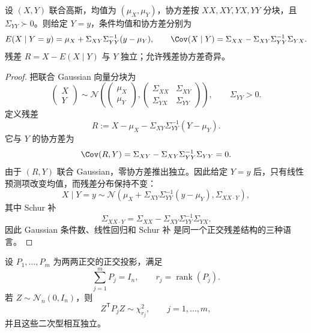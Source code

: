 \begin{proposition}
设 $(X,Y)$ 联合高斯，均值为 $(\mu_X,\mu_Y)$，协方差按 $XX,XY,YX,YY$ 分块，且 $\Sigma_{YY}\succ0$。则给定 $Y=y$，条件均值和协方差分别为
\[
E(X\mid Y=y)=\mu_X+\Sigma_{XY}\Sigma_{YY}^{-1}(y-\mu_Y),
\qquad
\Cov(X\mid Y)=\Sigma_{XX}-\Sigma_{XY}\Sigma_{YY}^{-1}\Sigma_{YX}.
\]
残差 $R=X-E(X\mid Y)$ 与 $Y$ 独立；允许残差协方差奇异。
\end{proposition}
\begin{proof}
把联合 Gaussian 向量分块为
\[
\begin{pmatrix}X\\Y\end{pmatrix}
\sim
\mathcal N\!\left(
\begin{pmatrix}\mu_X\\\mu_Y\end{pmatrix},
\begin{pmatrix}
\Sigma_{XX}&\Sigma_{XY}\\
\Sigma_{YX}&\Sigma_{YY}
\end{pmatrix}
\right),
\qquad \Sigma_{YY}>0.
\]
定义残差
\[
R
:=X-\mu_X
-\Sigma_{XY}\Sigma_{YY}^{-1}(Y-\mu_Y).
\]
它与 $Y$ 的协方差为
\[
\Cov(R,Y)
=\Sigma_{XY}
-\Sigma_{XY}\Sigma_{YY}^{-1}\Sigma_{YY}=0.
\]
由于 $(R,Y)$ 联合 Gaussian，零协方差推出独立。因此给定 $Y=y$ 后，只有线性预测项改变均值，而残差分布保持不变：
\begin{equation}
X\mid Y=y
\sim
\mathcal N\!\left(
\mu_X+\Sigma_{XY}\Sigma_{YY}^{-1}(y-\mu_Y),
\Sigma_{XX\cdot Y}
\right),
\label{eq:math-stat-gaussian-conditional}
\end{equation}
其中 Schur 补
\begin{equation}
\Sigma_{XX\cdot Y}
=
\Sigma_{XX}
-\Sigma_{XY}\Sigma_{YY}^{-1}\Sigma_{YX}.
\label{eq:math-stat-gaussian-schur-complement}
\end{equation}
因此 Gaussian 条件数、线性回归和 Schur 补 是同一个正交残差结构的三种语言。
\end{proof}


\begin{theorem}
设 $P_1,\ldots,P_m$ 为两两正交的正交投影，满足
\[
 \sum_{j=1}^mP_j=I_n,
 \qquad
 r_j=\operatorname{rank}(P_j).
\]
若 $Z\sim\mathcal N_n(0,I_n)$，则
\[
 Z^{\mathsf T}P_jZ\sim\chi^2_{r_j},
 \qquad j=1,\ldots,m,
\]
并且这些二次型相互独立。
\end{theorem}

